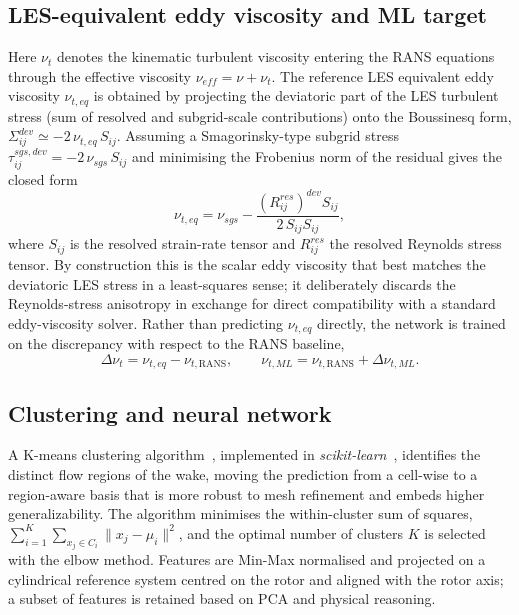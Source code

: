 \documentclass[12pt,a4paper]{article}
\begin{document}
\subsection{LES-equivalent eddy viscosity and ML target}
Here $\nu_t$ denotes the kinematic turbulent viscosity entering the RANS equations through
the effective viscosity $\nu_{eff} = \nu + \nu_t$. The reference LES equivalent eddy
viscosity $\nu_{t,eq}$ is obtained by projecting the deviatoric part of the LES turbulent
stress (sum of resolved and subgrid-scale contributions) onto the Boussinesq form,
$\Sigma_{ij}^{dev} \simeq -2\,\nu_{t,eq}\,S_{ij}$. Assuming a Smagorinsky-type subgrid
stress $\tau_{ij}^{sgs,dev} = -2\,\nu_{sgs}\,S_{ij}$ and minimising the Frobenius norm of
the residual gives the closed form
\begin{equation}
    \nu_{t,eq} = \nu_{sgs}
    - \frac{\left(R_{ij}^{res}\right)^{dev} S_{ij}}{2\,S_{ij}S_{ij}} ,
\end{equation}
where $S_{ij}$ is the resolved strain-rate tensor and $R_{ij}^{res}$ the resolved Reynolds
stress tensor. By construction this is the scalar eddy viscosity that best matches the
deviatoric LES stress in a least-squares sense; it deliberately discards the
Reynolds-stress anisotropy in exchange for direct compatibility with a standard
eddy-viscosity solver. Rather than predicting $\nu_{t,eq}$ directly, the network is
trained on the discrepancy with respect to the RANS baseline,
\begin{equation}
    \Delta\nu_t = \nu_{t,eq} - \nu_{t,\mathrm{RANS}} ,
    \qquad
    \nu_{t,ML} = \nu_{t,\mathrm{RANS}} + \Delta\nu_{t,ML} .
\end{equation}

\subsection{Clustering and neural network}
A K-means clustering algorithm~\cite{Carloni2026,Clustering_tieghi}, implemented in
\textit{scikit-learn}~\cite{scikit-learn}, identifies the distinct flow regions of the
wake, moving the prediction from a cell-wise to a region-aware basis that is more robust
to mesh refinement and embeds higher generalizability. The algorithm minimises the
within-cluster sum of squares, $\sum_{i=1}^{K}\sum_{x_j\in C_i}\lVert x_j-\mu_i\rVert^2$,
and the optimal number of clusters $K$ is selected with the elbow method. Features are
Min-Max normalised and projected on a cylindrical reference system centred on the rotor
and aligned with the rotor axis; a subset of features is retained based on PCA and
physical reasoning.
\end{document}
